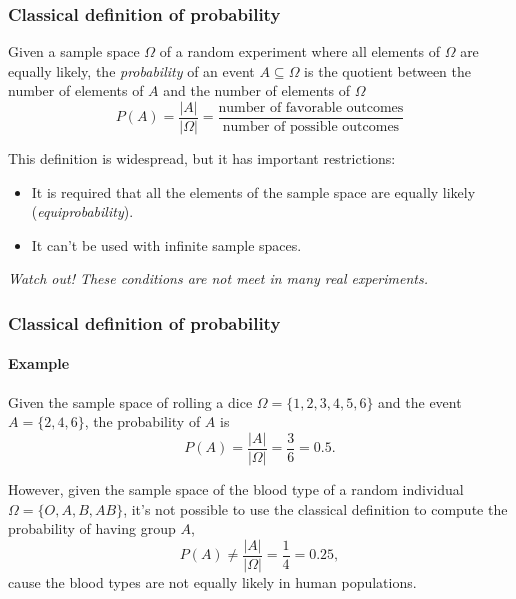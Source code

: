 \begin{frame}
\frametitle{Classical definition of probability}
\begin{definition}
Given a sample space $\Omega$ of a random experiment where all elements of $\Omega$ are equally likely, the
\emph{probability} of an event $A\subseteq \Omega$ is the quotient between the number of elements of $A$ and the number
of elements of $\Omega$
\[ P(A) = \frac{|A|}{|\Omega|} = \frac{\mbox{number of favorable outcomes}}{\mbox{number of possible outcomes}}\]
\end{definition}

This definition is widespread, but it has important restrictions:
\begin{itemize}
\item It is required that all the elements of the sample space are equally likely (\emph{equiprobability}).
\item It can't be used with infinite sample spaces.
\end{itemize}

\alert{\emph{Watch out! These conditions are not meet in many real experiments.}}
\end{frame}


\begin{frame}
\frametitle{Classical definition of probability}
\framesubtitle{Example}
Given the sample space of rolling a dice $\Omega=\{1,2,3,4,5,6\}$ and the event $A=\{2,4,6\}$, the probability of $A$ is 
\[
P(A) = \frac{|A|}{|\Omega|} = \frac{3}{6} = 0.5.
\]

However, given the sample space of the blood type of a random individual $\Omega=\{O,A,B,AB\}$, it's not possible to use
the classical definition to compute the probability of having group $A$,
\[
P(A) \neq \frac{|A|}{|\Omega|} = \frac{1}{4} = 0.25,
\]
cause the blood types are not equally likely in human populations. 
\end{frame}


